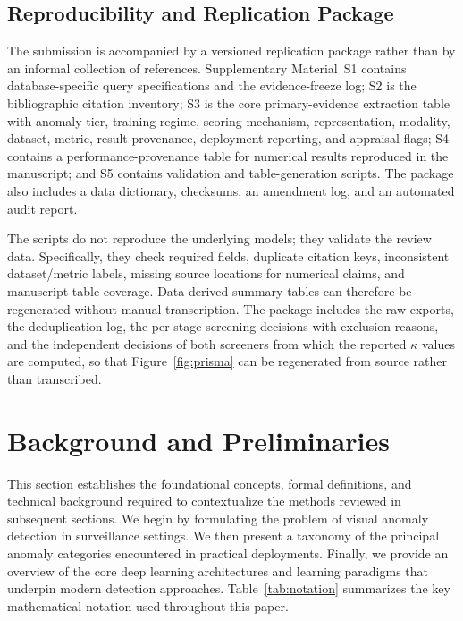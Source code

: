 \documentclass[10pt,a4paper]{article}
\begin{document}
\subsection{Reproducibility and Replication Package}
\label{subsec:reproducibility_package}
The submission is accompanied by a versioned replication package rather than by an informal collection of references. Supplementary Material~S1 contains database-specific query specifications and the evidence-freeze log; S2 is the bibliographic citation inventory; S3 is the core primary-evidence extraction table with anomaly tier, training regime, scoring mechanism, representation, modality, dataset, metric, result provenance, deployment reporting, and appraisal flags; S4 contains a performance-provenance table for numerical results reproduced in the manuscript; and S5 contains validation and table-generation scripts. The package also includes a data dictionary, checksums, an amendment log, and an automated audit report.

The scripts do not reproduce the underlying models; they validate the review data. Specifically, they check required fields, duplicate citation keys, inconsistent dataset/metric labels, missing source locations for numerical claims, and manuscript-table coverage. Data-derived summary tables can therefore be regenerated without manual transcription. The package includes the raw exports, the deduplication log, the per-stage screening decisions with exclusion reasons, and the independent decisions of both screeners from which the reported $\kappa$ values are computed, so that Figure~\ref{fig:prisma} can be regenerated from source rather than transcribed.

\section{Background and Preliminaries}
\label{sec:preliminaries}

This section establishes the foundational concepts, formal definitions, and technical background required to contextualize the methods reviewed in subsequent sections. We begin by formulating the problem of visual anomaly detection in surveillance settings. We then present a taxonomy of the principal anomaly categories encountered in practical deployments. Finally, we provide an overview of the core deep learning architectures and learning paradigms that underpin modern detection approaches. Table~\ref{tab:notation} summarizes the key mathematical notation used throughout this paper.
\end{document}
